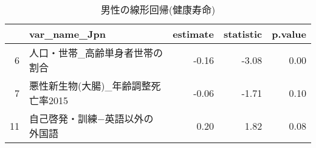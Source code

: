 \begin{table}[H]
\centering
\caption{男性の線形回帰(健康寿命)} 
\label{table_LM_HLE_m.tex}
\begingroup\tiny
\begin{adjustbox}{width=1\textwidth}
\begin{tabular}{rlrrr}
  \hline
 & var\_name\_Jpn & estimate & statistic & p.value \\ 
  \hline
  6 & 人口・世帯\_高齢単身者世帯の割合 & -0.16 & -3.08 & 0.00 \\ 
  7 & 悪性新生物(大腸)\_年齢調整死亡率2015 & -0.06 & -1.71 & 0.10 \\ 
  11 & 自己啓発・訓練−英語以外の外国語 & 0.20 & 1.82 & 0.08 \\ 
   \hline
\end{tabular}
\end{adjustbox}
\endgroup
\end{table}
